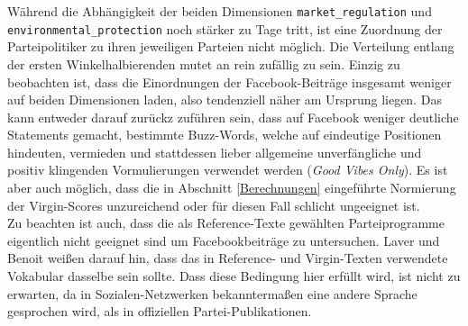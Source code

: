      Während die Abhängigkeit der beiden Dimensionen \verb|market_regulation| und \linebreak\verb|environmental_protection| noch stärker zu Tage tritt, ist eine Zuordnung der Parteipolitiker zu ihren jeweiligen Parteien nicht möglich. Die Verteilung entlang der ersten Winkelhalbierenden mutet an rein zufällig zu sein. Einzig zu beobachten ist, dass die Einordnungen der Facebook-Beiträge insgesamt weniger auf beiden Dimensionen laden, also tendenziell näher am Ursprung liegen. Das kann entweder darauf zurückz zuführen sein, dass auf Facebook weniger deutliche Statements gemacht, bestimmte Buzz-Words, welche auf eindeutige Positionen hindeuten, vermieden und stattdessen lieber allgemeine unverfängliche und positiv klingenden Vormulierungen verwendet werden (\emph{Good Vibes Only}). Es ist aber auch möglich, dass die in Abschnitt \ref{Berechnungen} eingeführte Normierung der Virgin-Scores unzureichend oder für diesen Fall schlicht ungeeignet ist. \\
     Zu beachten ist auch, dass die als Reference-Texte gewählten Parteiprogramme eigentlich nicht geeignet sind um Facebookbeiträge zu untersuchen. Laver und Benoit weißen darauf hin, dass das in Reference- und Virgin-Texten verwendete Vokabular dasselbe sein sollte. Dass diese Bedingung hier erfüllt wird, ist nicht zu erwarten, da in Sozialen-Netzwerken bekanntermaßen eine andere Sprache gesprochen wird, als in offiziellen Partei-Publikationen.
     
    